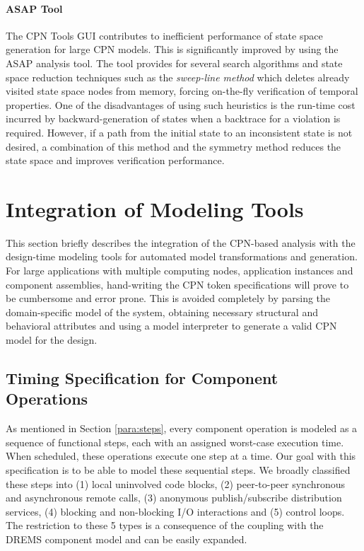 \paragraph{ASAP Tool}
The CPN Tools GUI contributes to inefficient performance of state space generation for large CPN models. This is significantly improved by using the ASAP \cite{ASAP} analysis tool. The tool provides for several search algorithms and state space reduction techniques such as the \emph{sweep-line method} \cite{Christensen2001} which deletes already visited state space nodes from memory, forcing on-the-fly verification of temporal properties. One of the disadvantages of using such heuristics is the run-time cost incurred by backward-generation of states when a backtrace for a violation is required. However, if a path from the initial state to an inconsistent state is not desired, a combination of this method and the symmetry method reduces the state space and improves verification performance.  


\section{Integration of Modeling Tools}
\label{sec:IMT}

This section briefly describes the integration of the CPN-based analysis with the design-time modeling tools for automated model transformations and generation. For large applications with multiple computing nodes, application instances and component assemblies, hand-writing the CPN token specifications will prove to be cumbersome and error prone. This is avoided completely by parsing the domain-specific model of the system, obtaining necessary structural and behavioral attributes and using a model interpreter to generate a valid CPN model for the design.

\subsection{Timing Specification for Component Operations}

As mentioned in Section \ref{para:steps}, every component operation is modeled as a sequence of functional steps, each with an assigned worst-case execution time. When scheduled, these operations execute one step at a time. Our goal with this specification is to be able to model these sequential steps. We broadly classified these steps into (1) local uninvolved code blocks, (2) peer-to-peer synchronous and asynchronous remote calls, (3) anonymous publish/subscribe distribution services, (4) blocking  and non-blocking I/O interactions and (5) control loops. The restriction to these 5 types is a consequence of the coupling with the DREMS component model and can be easily expanded. 

